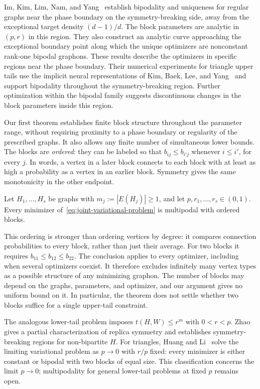 Im, Kim, Lim, Nam, and Yang~\cite{ImKimLimNamYangBipodal} establish
bipodality and uniqueness for regular graphs near the phase boundary
on the symmetry-breaking side, away from the exceptional target density
$(d-1)/d$. The block parameters are analytic in $(p,r)$ in this region.
They also construct an analytic curve approaching the exceptional
boundary point along which the unique
optimizers are nonconstant rank-one bipodal graphons. These results
describe the optimizers in specific regions near the phase boundary.
Their numerical experiments for triangle upper tails use the implicit
neural representations of Kim, Baek, Lee, and
Yang~\cite{KimBaekLeeYangGraphons} and support bipodality throughout the
symmetry-breaking region. Further optimization within the bipodal family
suggests discontinuous changes in the block parameters inside this region.

Our first theorem establishes finite block structure throughout the
parameter range, without requiring proximity to a phase boundary or
regularity of the prescribed graphs. It also allows any finite number
of simultaneous lower bounds. The blocks are \emph{ordered}: they can be
labeled so that $b_{ij}\le b_{i'j}$ whenever $i\le i'$, for every $j$.
In words, a vertex in a later block connects to each block with at least
as high a probability as a vertex in an earlier block. Symmetry gives
the same monotonicity in the other endpoint.

\begin{theorem}\label{thm:joint-upper-tail}
Let $H_1,\dots,H_s$ be graphs with $m_j:=|E(H_j)|\ge1$, and let
$p,r_1,\dots,r_s\in(0,1)$. Every minimizer
of~\eqref{eq:joint-variational-problem} is multipodal with ordered blocks.
\end{theorem}

This ordering is stronger than ordering vertices by degree: it compares
connection probabilities to every block, rather than just their average.
For two blocks it requires $b_{11}\le b_{12}\le b_{22}$. The conclusion
applies to every optimizer, including when several optimizers coexist.
It therefore excludes infinitely many vertex types as a possible
structure of any minimizing graphon. The number of blocks may depend on
the graphs, parameters, and optimizer, and our argument gives no uniform
bound on it. In particular, the theorem does not settle whether two
blocks suffice for a single upper-tail constraint.

The analogous lower-tail problem imposes $t(H,W)\le r^m$ with $0<r<p$.
Zhao~\cite{Zhao2017LowerTail} gives a partial characterization of replica
symmetry and establishes symmetry-breaking regions for non-bipartite $H$.
For triangles, Huang and Li~\cite{HuangLi2026LowerTail} solve the limiting
variational problem as $p\to0$ with $r/p$ fixed: every minimizer is either
constant or bipodal with two blocks of equal size. This classification
concerns the limit $p\to0$; multipodality for general lower-tail problems
at fixed $p$ remains open.

